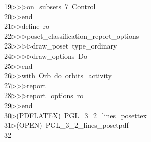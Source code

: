 \begin{tabbing}
19\>$\triangleright$\>$\triangleright$\>$\triangleright$\>on\_subsets\ 7\ Control\ \\[0pt]
20\>$\triangleright$\>$\triangleright$\>end\ \\[0pt]
21\>$\triangleright$\>$\triangleright$\>define\ ro\ \\[0pt]
22\>$\triangleright$\>$\triangleright$\>$\triangleright$\>poset\_classification\_report\_options\ \\[0pt]
23\>$\triangleright$\>$\triangleright$\>$\triangleright$\>$\triangleright$\>draw\_poset\ type\_ordinary\ \\[0pt]
24\>$\triangleright$\>$\triangleright$\>$\triangleright$\>$\triangleright$\>draw\_options\ Do\ \\[0pt]
25\>$\triangleright$\>$\triangleright$\>end\ \\[0pt]
26\>$\triangleright$\>$\triangleright$\>with\ Orb\ do\ orbits\_activity\ \\[0pt]
27\>$\triangleright$\>$\triangleright$\>$\triangleright$\>report\ \ \\[0pt]
28\>$\triangleright$\>$\triangleright$\>$\triangleright$\>report\_options\ ro\ \\[0pt]
29\>$\triangleright$\>$\triangleright$\>end\ \\[0pt]
30\>$\triangleright$\>(PDFLATEX)\ PGL\_3\_2\_lines\_posettex\\[0pt]
31\>$\triangleright$\>(OPEN)\ PGL\_3\_2\_lines\_posetpdf\\[0pt]
32\>\end{tabbing}
